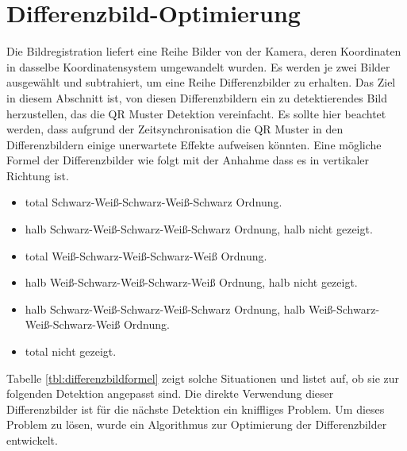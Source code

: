\section{Differenzbild-Optimierung}
Die Bildregistration liefert eine Reihe Bilder von der Kamera, deren Koordinaten in dasselbe Koordinatensystem umgewandelt wurden. Es werden je zwei Bilder ausgewählt und subtrahiert, um eine Reihe Differenzbilder zu erhalten. Das Ziel in diesem Abschnitt ist, von diesen Differenzbildern ein zu detektierendes Bild herzustellen, das die QR Muster Detektion vereinfacht. Es sollte hier beachtet werden, dass aufgrund der Zeitsynchronisation die QR Muster in den Differenzbildern einige unerwartete Effekte aufweisen könnten. Eine mögliche Formel der Differenzbilder wie folgt mit der Anhahme dass es in vertikaler Richtung ist.

\begin{itemize}
	\item total Schwarz-Weiß-Schwarz-Weiß-Schwarz Ordnung.
	\item halb Schwarz-Weiß-Schwarz-Weiß-Schwarz Ordnung, halb nicht gezeigt.
	\item total Weiß-Schwarz-Weiß-Schwarz-Weiß Ordnung.
	\item halb Weiß-Schwarz-Weiß-Schwarz-Weiß Ordnung, halb nicht gezeigt.
	\item halb Schwarz-Weiß-Schwarz-Weiß-Schwarz Ordnung, halb Weiß-Schwarz-Weiß-Schwarz-Weiß Ordnung.
	\item total nicht gezeigt.
\end{itemize}

Tabelle \ref{tbl:differenzbildformel} zeigt solche Situationen und listet auf, ob sie zur folgenden Detektion angepasst sind. Die direkte Verwendung dieser Differenzbilder ist für die nächste Detektion ein kniffliges Problem. Um dieses Problem zu lösen, wurde ein Algorithmus zur Optimierung der Differenzbilder entwickelt.

